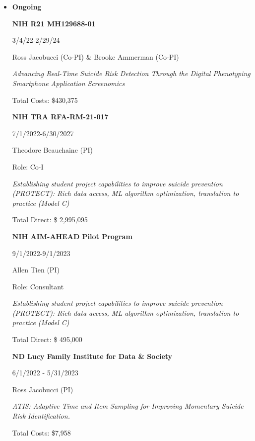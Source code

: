 \documentclass[letterpaper,10pt]{article}
\begin{document}
\begin{itemize} 
	\setlength{\topsep}{0pt}%
	\setlength{\leftmargin}{0.1in}%
	\setlength{\listparindent}{-0.1in}%
	\setlength{\itemindent}{-0.2in}%
	\setlength{\parsep}{\parskip}%
	
	\item {\textbf{\large{Ongoing}}}
	
	\begin{center}
			\noindent\parbox{0.7\textwidth}{\raggedright \textbf{NIH R21 MH129688-01}}\hfill%
		\parbox{0.2\textwidth}{\raggedright 3/4/22-2/29/24}
		\parbox{6.5in}{{Ross Jacobucci (Co-PI) \& Brooke Ammerman (Co-PI)}  }
		\parbox{6.5in}{\textit{Advancing Real-Time Suicide Risk Detection Through the Digital Phenotyping Smartphone Application Screenomics}}
		\parbox{6.5in}{Total Costs: \$430,375}
	\end{center}



\begin{center}
	\noindent\parbox{0.7\textwidth}{\raggedright \textbf{NIH TRA RFA-RM-21-017}}\hfill%
	\parbox{0.2\textwidth}{\raggedright 7/1/2022-6/30/2027}
	\parbox{6.5in}{{Theodore Beauchaine (PI)} }
	\parbox{6.5in} {Role: Co-I}
	\parbox{6.5in}{\textit{Establishing student project capabilities to improve suicide prevention (PROTECT): Rich data access, ML algorithm optimization, translation to practice (Model C)}}
	\parbox{6.5in}{Total Direct: \$ 2,995,095 }
\end{center}

\begin{center}
		\noindent\parbox{0.7\textwidth}{\raggedright \textbf{NIH AIM-AHEAD Pilot Program}}\hfill%
	\parbox{0.2\textwidth}{\raggedright 9/1/2022-9/1/2023}
	\parbox{6.5in}{{Allen Tien (PI)} }
	\parbox{6.5in} {Role: Consultant}
	\parbox{6.5in}{\textit{Establishing student project capabilities to improve suicide prevention (PROTECT): Rich data access, ML algorithm optimization, translation to practice (Model C)}}
	\parbox{6.5in}{Total Direct: \$ 495,000}
\end{center}




\begin{center}
		\noindent\parbox{0.7\textwidth}{\raggedright \textbf{ND Lucy Family Institute for Data \& Society}}\hfill%
\parbox{0.2\textwidth}{\raggedright 6/1/2022 - 5/31/2023}
	\parbox{6.5in}{{Ross Jacobucci (PI)}  }
	\parbox{6.5in}{\textit{ATIS: Adaptive Time and Item Sampling for Improving Momentary Suicide Risk Identification.}}
	\parbox{6.5in}{Total Costs: \$7,958}
\end{center}
	


\end{itemize}
\end{document}
